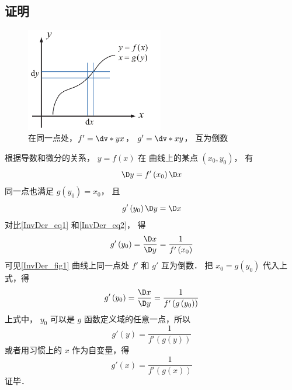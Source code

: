 \subsection{证明}
\begin{figure}[h]
\centering
\includegraphics[width=6cm]{./figures/InvDer.pdf}
\caption{在同一点处，$f'=\dv*{y}{x}$， $g'=\dv*{x}{y}$， 互为倒数}\label{InvDer_fig1}
\end{figure}
根据导数和微分的关系， $y = f\left( x \right)$ 在 曲线上的某点 $\left( {{x_0},{y_0}} \right)$， 有
 \begin{equation}\label{InvDer_eq1}
\D y = f'\left( {{x_0}} \right)\D x
\end{equation}
同一点也满足 $g\left( {{y_0}} \right) = {x_0}$， 且
 \begin{equation}\label{InvDer_eq2}
g'\left( {{y_0}} \right)\D y = \D x
\end{equation}
对比\autoref{InvDer_eq1} 和\autoref{InvDer_eq2}， 得
\begin{equation}
g'\left( {{y_0}} \right) = \frac{\D x}{\D y} = \frac{1}{{f'\left( {{x_0}} \right)}}
\end{equation}
可见\autoref{InvDer_fig1} 曲线上同一点处 $f'$ 和 $g'$ 互为倒数． 把 ${x_0} = g\left( {{y_0}} \right)$ 代入上式，得
\begin{equation}
g'\left( {{y_0}} \right) = \frac{\D x}{\D y} = \frac{1}{{f'\left( {g\left( {{y_0}} \right)} \right)}}
\end{equation} 
上式中， ${y_0}$ 可以是 $g$ 函数定义域的任意一点，所以
\begin{equation}
g'\left( y \right) = \frac{1}{{f'\left( {g\left( y \right)} \right)}}
\end{equation} 
或者用习惯上的 $x$ 作为自变量，得
\begin{equation}
g'\left( x \right) = \frac{1}{{f'\left( {g\left( x \right)} \right)}}
\end{equation}
证毕．
















